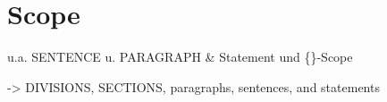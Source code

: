 \section{Scope}\label{sec:scope}
u.a. SENTENCE u. PARAGRAPH \& Statement und \{\}-Scope


-> DIVISIONS, SECTIONS, paragraphs, sentences, and statements